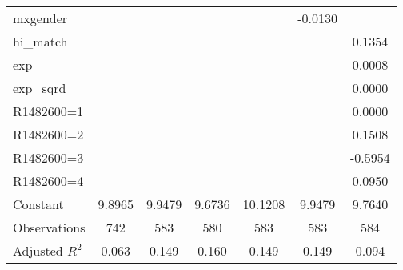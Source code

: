 \begin{table}[htbp]
\begin{tabular}{l*{6}{c}}
mxgender            &                     &                     &                     &                     &     -0.0130\sym{**} &                     \\
hi\_match            &                     &                     &                     &                     &                     &      0.1354\sym{**} \\
exp                 &                     &                     &                     &                     &                     &      0.0008         \\
exp\_sqrd            &                     &                     &                     &                     &                     &      0.0000         \\
R1482600=1          &                     &                     &                     &                     &                     &      0.0000         \\
R1482600=2          &                     &                     &                     &                     &                     &      0.1508         \\
R1482600=3          &                     &                     &                     &                     &                     &     -0.5954         \\
R1482600=4          &                     &                     &                     &                     &                     &      0.0950         \\
Constant            &      9.8965\sym{***}&      9.9479\sym{***}&      9.6736\sym{***}&     10.1208\sym{***}&      9.9479\sym{***}&      9.7640\sym{***}\\
\hline
Observations        &         742         &         583         &         580         &         583         &         583         &         584         \\
Adjusted \(R^{2}\)  &       0.063         &       0.149         &       0.160         &       0.149         &       0.149         &       0.094         \\
\hline\hline
\end{tabular}
\end{table}
